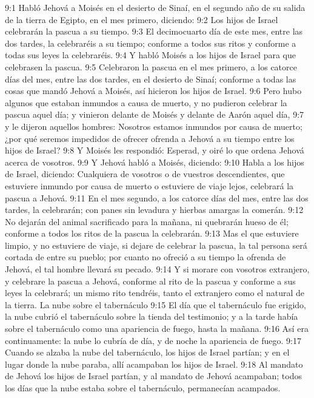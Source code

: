 9:1 Habló Jehová a Moisés en el desierto de Sinaí, en el segundo año de su salida de la tierra de Egipto, en el mes primero, diciendo:  
9:2 Los hijos de Israel celebrarán la pascua a su tiempo.  
9:3 El decimocuarto día de este mes, entre las dos tardes, la celebraréis a su tiempo; conforme a todos sus ritos y conforme a todas sus leyes la celebraréis.  
9:4 Y habló Moisés a los hijos de Israel para que celebrasen la pascua.  
9:5 Celebraron la pascua en el mes primero, a los catorce días del mes, entre las dos tardes, en el desierto de Sinaí; conforme a todas las cosas que mandó Jehová a Moisés, así hicieron los hijos de Israel.  
9:6 Pero hubo algunos que estaban inmundos a causa de muerto, y no pudieron celebrar la pascua aquel día; y vinieron delante de Moisés y delante de Aarón aquel día, 
9:7 y le dijeron aquellos hombres: Nosotros estamos inmundos por causa de muerto; ¿por qué seremos impedidos de ofrecer ofrenda a Jehová a su tiempo entre los hijos de Israel?  
9:8 Y Moisés les respondió: Esperad, y oiré lo que ordena Jehová acerca de vosotros.  
9:9 Y Jehová habló a Moisés, diciendo:  
9:10 Habla a los hijos de Israel, diciendo: Cualquiera de vosotros o de vuestros descendientes, que estuviere inmundo por causa de muerto o estuviere de viaje lejos, celebrará la pascua a Jehová.  
9:11 En el mes segundo, a los catorce días del mes, entre las dos tardes, la celebrarán; con panes sin levadura y hierbas amargas la comerán.  
9:12 No dejarán del animal sacrificado para la mañana, ni quebrarán hueso de él; conforme a todos los ritos de la pascua la celebrarán.  
9:13 Mas el que estuviere limpio, y no estuviere de viaje, si dejare de celebrar la pascua, la tal persona será cortada de entre su pueblo; por cuanto no ofreció a su tiempo la ofrenda de Jehová, el tal hombre llevará su pecado.  
9:14 Y si morare con vosotros extranjero, y celebrare la pascua a Jehová, conforme al rito de la pascua y conforme a sus leyes la celebrará; un mismo rito tendréis, tanto el extranjero como el natural de la tierra.  
La nube sobre el tabernáculo   
9:15 El día que el tabernáculo fue erigido, la nube cubrió el tabernáculo sobre la tienda del testimonio; y a la tarde había sobre el tabernáculo como una apariencia de fuego, hasta la mañana.  
9:16 Así era continuamente: la nube lo cubría de día, y de noche la apariencia de fuego.  
9:17 Cuando se alzaba la nube del tabernáculo, los hijos de Israel partían; y en el lugar donde la nube paraba, allí acampaban los hijos de Israel.  
9:18 Al mandato de Jehová los hijos de Israel partían, y al mandato de Jehová acampaban; todos los días que la nube estaba sobre el tabernáculo, permanecían acampados.  
